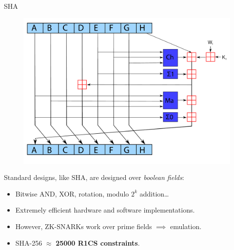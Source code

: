 \documentclass[beamer={10pt,xcolor=dvipsnames},target=mst]{thud}
\begin{document}
\begin{frame}{SHA~\cite{Dang2015}}
  \begin{figure}
    \centering
    \includegraphics[scale=0.175]{res/SHA-2.pdf}
  \end{figure}

  Standard designs, like SHA, are designed over \emph{boolean fields}:
  \begin{itemize}
    \item Bitwise AND, XOR, rotation, modulo \(2^{k}\) addition\dots
    \item Extremely efficient hardware and software implementations.
    \item However, ZK-SNARKs work over prime fields \(\implies \) emulation.
    \item SHA-256 \(\approx \) \textbf{25000 R1CS constraints}.
  \end{itemize}
\end{frame}
\end{document}
